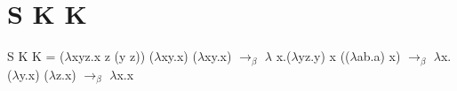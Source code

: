 \documentclass[16pt,a4paper]{scrartcl}
\begin{document}
\section{S K K}

S K K = ($\lambda$xyz.x z (y z)) ($\lambda$xy.x) ($\lambda$xy.x)
$\rightarrow_\beta$ $\lambda$ x.($\lambda$yz.y) x (($\lambda$ab.a) x)
$\rightarrow_\beta$ $\lambda$x.($\lambda$y.x) ($\lambda$z.x)
$\rightarrow_\beta$ $\lambda$x.x
\end{document}
